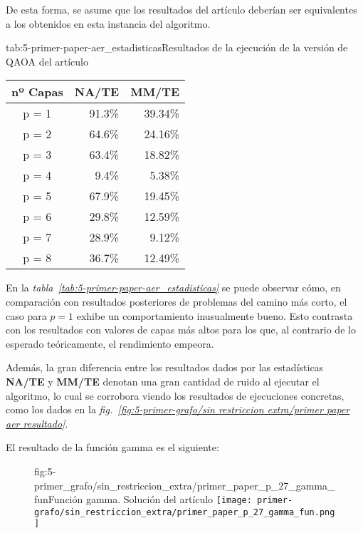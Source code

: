 De esta forma, se asume que los resultados del artículo deberían ser equivalentes a los obtenidos en esta instancia del algoritmo.

\begin{table}[Resultados QAOA {--} artículo de Urgelles et al. {--} solución del artículo]{tab:5-primer-paper-aer_estadisticas}{Resultados de la ejecución de la versión de QAOA del artículo\cite{multi-objective_routing_optimization}}
  \centering
  \begin{tabular}{|c|r|r|}
    \hline
    \textbf{nº Capas} & \textbf{NA/TE} & \textbf{MM/TE} \\ \hline
    p = 1 & 91.3\% & 39.34\% \\ \hline
    p = 2 & 64.6\% & 24.16\% \\ \hline
    p = 3 & 63.4\% & 18.82\% \\ \hline
    p = 4 &  9.4\% &  5.38\% \\ \hline
    p = 5 & 67.9\% & 19.45\% \\ \hline
    p = 6 & 29.8\% & 12.59\% \\ \hline
    p = 7 & 28.9\% &  9.12\% \\ \hline
    p = 8 & 36.7\% & 12.49\% \\ \hline
  \end{tabular}
\end{table}

En la \textit{tabla~\ref{tab:5-primer-paper-aer_estadisticas}} se puede observar cómo, en comparación con resultados posteriores de problemas del camino más corto, el caso para $p = 1$ exhibe un comportamiento inusualmente bueno.
Esto contrasta con los resultados con valores de capas más altos para los que, al contrario de lo esperado teóricamente, el rendimiento empeora.

Además, la gran diferencia entre los resultados dados por las estadísticas \textbf{NA/TE} y \textbf{MM/TE} denotan una gran cantidad de ruido al ejecutar el algoritmo, lo cual se corrobora viendo los resultados de ejecuciones concretas, como los dados en la \textit{fig.~\ref{fig:5-primer-grafo/sin restriccion extra/primer paper aer resultado}}.

El resultado de la función gamma es el siguiente:
\begin{figure}[Resultados QAOA {--} artículo de Urgelles et al. {--} función gamma de la solución del artículo]{fig:5-primer_grafo/sin_restriccion_extra/primer_paper_p_27_gamma_fun}{Función gamma. Solución del artículo\cite{multi-objective_routing_optimization}}
  \centering
  \texttt{[image: primer-grafo/sin\_restriccion\_extra/primer\_paper\_p\_27\_gamma\_fun.png]}
\end{figure}

